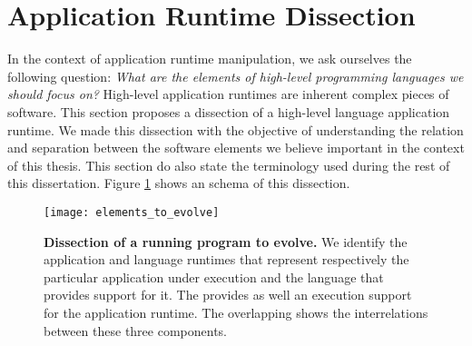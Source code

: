


\section{Application Runtime Dissection}

In the context of application runtime manipulation, we ask ourselves the following question: \emph{What are the elements of high-level programming languages we should focus on?} High-level application runtimes are inherent complex pieces of software. 
This section proposes a dissection of a high-level language application runtime. We made this dissection with the objective of understanding the relation and separation between the software elements we believe important in the context of this thesis. This section do also state the terminology used during the rest of this dissertation. Figure \ref{fig:whatToEvolve} shows an schema of this dissection.

\begin{figure}[!ht]
\begin{center}
\texttt{[image: elements\_to\_evolve]}
\caption{\textbf{Dissection of a running program to evolve.}\label{fig:whatToEvolve} We identify the application and language runtimes that represent respectively the particular application under execution and the language that provides support for it. The \VM provides as well an execution support for the application runtime. The overlapping shows the interrelations between these three components.}
\end{center}
\end{figure}

